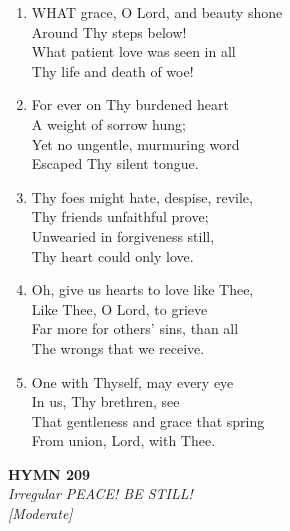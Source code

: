 \begin{enumerate}
    \item WHAT grace, O Lord, and beauty shone \\
        Around Thy steps below! \\
        What patient love was seen in all \\
        Thy life and death of woe!

    \item For ever on Thy burdened heart \\
        A weight of sorrow hung; \\
        Yet no ungentle, murmuring word \\
        Escaped Thy silent tongue.

    \item Thy foes might hate, despise, revile, \\
        Thy friends unfaithful prove; \\
        Unwearied in forgiveness still, \\
        Thy heart could only love.

    \item Oh, give us hearts to love like Thee, \\
        Like Thee, O Lord, to grieve \\
        Far more for others' sins, than all \\
        The wrongs that we receive.

    \item One with Thyself, may every eye \\
        In us, Thy brethren, see \\
        That gentleness and grace that spring \\
        From union, Lord, with Thee.

\end{enumerate}

\newpage
\begin{center}
    {\Large \textbf{HYMN 209}}
    \\
    \textit{Irregular PEACE! BE STILL!}
    \\
    \textit{\small [Moderate]}
\end{center}
\vspace{1em}

